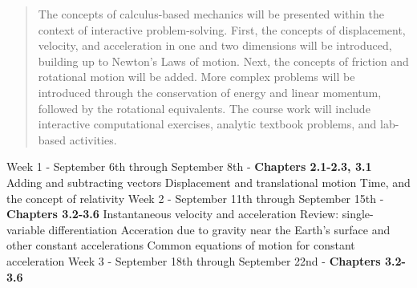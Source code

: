 \documentclass[10pt]{article}
\begin{document}
\maketitle

\begin{abstract}
The concepts of calculus-based mechanics will be presented within the context of interactive problem-solving.  First, the concepts of displacement, velocity, and acceleration in one and two dimensions will be introduced, building up to Newton's Laws of motion.  Next, the concepts of friction and rotational motion will be added.  More complex problems will be introduced through the conservation of energy and linear momentum, followed by the rotational equivalents.  The course work will include interactive computational exercises, analytic textbook problems, and lab-based activities.
\end{abstract}

\begin{outline}[enumerate]
\1 Week 1 - September 6th through September 8th - \textbf{Chapters 2.1-2.3, 3.1}
\2 Adding and subtracting vectors
\2 Displacement and translational motion
\2 Time, and the concept of relativity
\1 Week 2 - September 11th through September 15th - \textbf{Chapters 3.2-3.6}
\2 Instantaneous velocity and acceleration
\3 Review: single-variable differentiation
\2 Acceration due to gravity near the Earth's surface and other constant accelerations
\2 Common equations of motion for constant acceleration	
\1 Week 3 - September 18th through September 22nd - \textbf{Chapters 3.2-3.6}
\2 
\end{outline}
\end{document}
